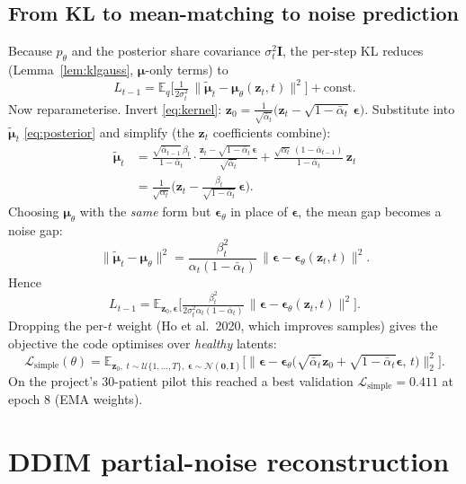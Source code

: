 \documentclass[12pt,a4paper]{article}
\theoremstyle{definition}
\theoremstyle{plain}
\newcommand{\E}{\mathbb{E}}
\newcommand{\N}{\mathcal{N}}
\newcommand{\z}{\bm{z}}
\newcommand{\eps}{\bm{\epsilon}}
\newcommand{\II}{\mathbf{I}}
\newcommand{\abar}{\bar{\alpha}}
\begin{document}
\subsection{From KL to mean-matching to noise prediction}
Because $p_\theta$ and the posterior share covariance $\sigma_t^2\II$, the per-step
KL reduces (Lemma~\ref{lem:klgauss}, $\bm\mu$-only terms) to
\begin{equation}
L_{t-1}=\E_q\!\Big[\tfrac{1}{2\sigma_t^2}\,\|\tilde{\bm\mu}_t-\bm\mu_\theta(\z_t,t)\|^2\Big]+\text{const}.
\label{eq:meanmatch}
\end{equation}
Now reparameterise. Invert \eqref{eq:kernel}:
$\z_0=\frac{1}{\sqrt{\abar_t}}\big(\z_t-\sqrt{1-\abar_t}\,\eps\big)$. Substitute into
$\tilde{\bm\mu}_t$ \eqref{eq:posterior} and simplify (the $\z_t$ coefficients combine):
\begin{align}
\tilde{\bm\mu}_t
&=\frac{\sqrt{\abar_{t-1}}\,\beta_t}{1-\abar_t}\cdot
   \frac{\z_t-\sqrt{1-\abar_t}\,\eps}{\sqrt{\abar_t}}
  +\frac{\sqrt{\alpha_t}\,(1-\abar_{t-1})}{1-\abar_t}\,\z_t\\
&=\frac{1}{\sqrt{\alpha_t}}\Big(\z_t-\frac{\beta_t}{\sqrt{1-\abar_t}}\,\eps\Big).
\label{eq:mu-eps}
\end{align}
Choosing $\bm\mu_\theta$ with the \emph{same} form but $\eps_\theta$ in place of
$\eps$, the mean gap becomes a noise gap:
\begin{equation}
\|\tilde{\bm\mu}_t-\bm\mu_\theta\|^2
=\frac{\beta_t^2}{\alpha_t(1-\abar_t)}\,\|\eps-\eps_\theta(\z_t,t)\|^2.
\end{equation}
Hence
\begin{equation}
L_{t-1}=\E_{\z_0,\eps}\!\Big[\tfrac{\beta_t^2}{2\sigma_t^2\alpha_t(1-\abar_t)}\,
\|\eps-\eps_\theta(\z_t,t)\|^2\Big].
\label{eq:Lt}
\end{equation}
Dropping the per-$t$ weight (Ho et al.\ 2020, which improves samples) gives the
objective the code optimises over \emph{healthy} latents:
\begin{equation}
\boxed{\;
\mathcal L_{\mathrm{simple}}(\theta)=
\E_{\z_0,\;t\sim\mathcal U\{1,\dots,T\},\;\eps\sim\N(\bm0,\II)}
\Big[\big\|\eps-\eps_\theta\!\big(\sqrt{\abar_t}\z_0+\sqrt{1-\abar_t}\eps,\,t\big)\big\|_2^2\Big].
\;}
\label{eq:simple}
\end{equation}
On the project's $30$-patient pilot this reached a best validation
$\mathcal L_{\mathrm{simple}}=0.411$ at epoch $8$ (EMA weights).

\section{DDIM partial-noise reconstruction}
\label{sec:ddim}
\end{document}
